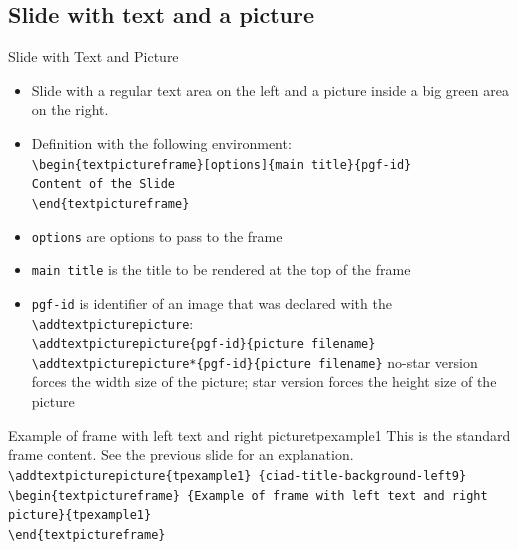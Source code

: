 \documentclass[english,sectioncirclenumberstyle]{ciadbeamer}
\begin{document}
\subsection{Slide with text and a picture}
\subsectiontableofcontentslide

\begin{frame}{Slide with Text and Picture}
	\begin{itemize}
		\item Slide with a regular text area on the left and a picture inside a big green area on the right.
		\item Definition with the following environment: \\
		\texttt{{\textbackslash}begin\{textpictureframe\}[options]\{main title\}\{pgf-id\}} \\
		\texttt{Content of the Slide} \\
		\texttt{{\textbackslash}end\{textpictureframe\}}
		\item \texttt{options} are options to pass to the frame
		\item \texttt{main title} is the title to be rendered at the top of the frame
		\item \texttt{pgf-id} is identifier of an image that was declared with the \texttt{{\textbackslash}addtextpicturepicture}: \\
		\texttt{{\textbackslash}addtextpicturepicture\{pgf-id\}\{picture filename\}} \\
		\texttt{{\textbackslash}addtextpicturepicture*\{pgf-id\}\{picture filename\}}
		no-star version forces the width size of the picture; star version forces the height size of the picture
	\end{itemize}
\end{frame}

\begin{textpictureframe}{{Example of frame} with left text and right picture}{tpexample1}
	This is the standard frame content. See the previous slide for an explanation. \\[.5cm]
	\smaller
	\texttt{{\textbackslash}addtextpicturepicture\{tpexample1\} \{ciad-title-background-left9\}} \\
	\texttt{{\textbackslash}begin\{textpictureframe\} \{Example of frame with left text and right picture\}\{tpexample1\}} \\
	\texttt{{\textbackslash}end\{textpictureframe\}}
\end{textpictureframe}
\end{document}
